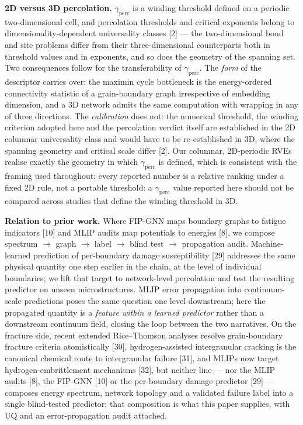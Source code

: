 \documentclass[11pt]{article}
\begin{document}
\textbf{2D versus 3D percolation.} $\gamma_{\mathrm{perc}}$ is a winding threshold defined on a periodic two-dimensional cell, and percolation thresholds and critical exponents belong to dimensionality-dependent universality classes [2] --- the two-dimensional bond and site problems differ from their three-dimensional counterparts both in threshold values and in exponents, and so does the geometry of the spanning set. Two consequences follow for the transferability of $\gamma_{\mathrm{perc}}$. The \textit{form} of the descriptor carries over: the maximin cycle bottleneck is the energy-ordered connectivity statistic of a grain-boundary graph irrespective of embedding dimension, and a 3D network admits the same computation with wrapping in any of three directions. The \textit{calibration} does not: the numerical threshold, the winding criterion adopted here and the percolation verdict itself are established in the 2D columnar universality class and would have to be re-established in 3D, where the spanning geometry and critical scale differ [2]. Our columnar, 2D-periodic RVEs realise exactly the geometry in which $\gamma_{\mathrm{perc}}$ is defined, which is consistent with the framing used throughout: every reported number is a relative ranking under a fixed 2D rule, not a portable threshold: a $\gamma_{\mathrm{perc}}$ value reported here should not be compared across studies that define the winding threshold in 3D.

\textbf{Relation to prior work.} Where FIP-GNN maps boundary graphs to fatigue indicators [10] and MLIP audits map potentials to energies [8], we compose spectrum $\rightarrow$ graph $\rightarrow$ label $\rightarrow$ blind test $\rightarrow$ propagation audit. Machine-learned prediction of per-boundary damage susceptibility [29] addresses the same physical quantity one step earlier in the chain, at the level of individual boundaries; we lift that target to network-level percolation and test the resulting predictor on unseen microstructures. MLIP error propagation into continuum-scale predictions poses the same question one level downstream; here the propagated quantity is a \textit{feature within a learned predictor} rather than a downstream continuum field, closing the loop between the two narratives. On the fracture side, recent extended Rice--Thomson analyses resolve grain-boundary fracture criteria atomistically [30], hydrogen-assisted intergranular cracking is the canonical chemical route to intergranular failure [31], and MLIPs now target hydrogen-embrittlement mechanisms [32], but neither line --- nor the MLIP audits [8], the FIP-GNN [10] or the per-boundary damage predictor [29] --- composes energy spectrum, network topology and a validated failure label into a single blind-tested predictor; that composition is what this paper supplies, with UQ and an error-propagation audit attached.
\end{document}
